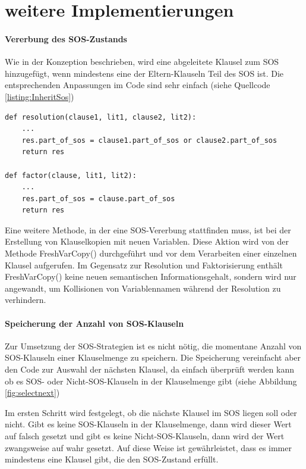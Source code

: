 \section{weitere Implementierungen}
\label{section:weitereImpl}

\paragraph{Vererbung des SOS-Zustands}
Wie in der Konzeption beschrieben, wird eine abgeleitete Klausel zum SOS hinzugefügt, wenn mindestens eine der Eltern-Klauseln Teil des SOS ist. Die entsprechenden Anpassungen im Code sind sehr einfach (siehe Quellcode \ref{listing:InheritSos})
\begin{lstlisting}[caption={Implementierung der Vererbung des SOS.Zustands an abgeleitee Klauseln}label={listing:InheritSos}]
def resolution(clause1, lit1, clause2, lit2):
	...
	res.part_of_sos = clause1.part_of_sos or clause2.part_of_sos
	return res
	
def factor(clause, lit1, lit2):
	...
	res.part_of_sos = clause.part_of_sos
	return res
\end{lstlisting}
Eine weitere Methode, in der eine SOS-Vererbung stattfinden muss, ist bei der Erstellung von Klauselkopien mit neuen Variablen. Diese Aktion wird von der Methode FreshVarCopy() durchgeführt und vor dem Verarbeiten einer einzelnen Klausel aufgerufen.
Im Gegensatz zur Resolution und Faktorisierung enthält FreshVarCopy() keine neuen semantischen Informationsgehalt, sondern wird nur angewandt, um Kollisionen von Variablennamen während der Resolution zu verhindern.


\paragraph{Speicherung der Anzahl von SOS-Klauseln}
Zur Umsetzung der SOS-Strategien ist es nicht nötig, die momentane Anzahl von SOS-Klauseln einer Klauselmenge zu speichern. Die Speicherung vereinfacht aber den Code zur Auswahl der nächsten Klausel, da einfach überprüft werden kann ob es SOS- oder Nicht-SOS-Klauseln in der Klauselmenge gibt (siehe Abbildung \ref{fig:selectnext})

Im ersten Schritt wird festgelegt, ob die nächste Klausel im SOS liegen soll oder nicht. Gibt es keine SOS-Klauseln in der Klauselmenge, dann wird dieser Wert auf falsch gesetzt und gibt es keine Nicht-SOS-Klauseln, dann wird der Wert zwangsweise auf wahr gesetzt. Auf diese Weise ist gewährleistet, dass es immer mindestens eine Klausel gibt, die den SOS-Zustand erfüllt. 

